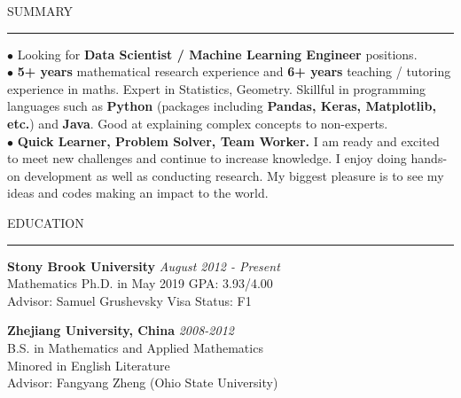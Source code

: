 \documentclass{resume} %
\renewenvironment{rSection}[1]{
\sectionskip
\textcolor{RoyalPurple}{\MakeUppercase{#1}}
\sectionlineskip
\hrule
\begin{list}{}{
\setlength{\leftmargin}{1.5em}
}
\item[]
}{
\end{list}
}
\begin{document}

\begin{rSection}{Summary}
$\bullet$ Looking for {\bf Data Scientist / Machine Learning Engineer} positions. \\
$\bullet$ {\bf 5+ years} mathematical research experience and {\bf 6+ years} teaching / tutoring experience in maths. Expert in Statistics, Geometry. Skillful in programming languages such as {\bf Python} (packages including {\bf Pandas, Keras, Matplotlib, etc.}) and {\bf Java}. Good at explaining complex concepts to non-experts.\\
$\bullet$ {\bf Quick Learner, Problem Solver, Team Worker.} I am ready and excited to meet new challenges and continue to increase knowledge. I enjoy doing hands-on development as well as conducting research. My biggest pleasure is to see my ideas and codes making an impact to the world.
\end{rSection}



\begin{rSection}{Education}


{\bf Stony Brook University} \hfill {\em August 2012 - Present} 
\\ Mathematics Ph.D. in May 2019 \hfill 
GPA: 3.93/4.00 \smallskip 
\\ Advisor: Samuel Grushevsky \hfill
Visa Status: F1 \smallskip 

{\bf Zhejiang University, China} \hfill {\em 2008-2012} 
\\ B.S. in Mathematics and Applied Mathematics\hfill
\\ Minored in English Literature
\\Advisor: Fangyang Zheng (Ohio State University)
 


\end{rSection}


\end{document}
